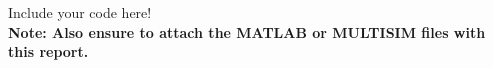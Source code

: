 %
 Include your code here! \\
 
\textbf{ Note: Also ensure to attach the MATLAB or MULTISIM files with this report.}
